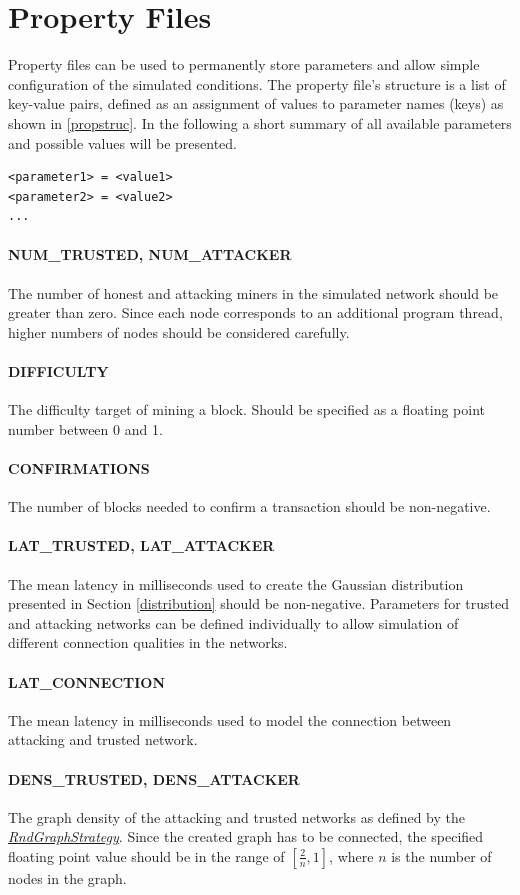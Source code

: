 \documentclass[a4paper,12pt,twoside]{report}
\begin{document}
\appendix

\chapter{Property Files} \label{prop}
Property files can be used to permanently store parameters and allow simple configuration of the simulated conditions. The property file's structure is a list of key-value pairs, defined as an assignment of values to parameter names (keys) as shown in \autoref{propstruc}. In the following a short summary of all available parameters and possible values will be presented.
\begin{lstlisting}[caption=Property file structure,label=propstruc]
<parameter1> = <value1>
<parameter2> = <value2>
...
\end{lstlisting}
\subsubsection{NUM\_TRUSTED, NUM\_ATTACKER}
The number of honest and attacking miners in the simulated network should be greater than zero. Since each node corresponds to an additional program thread, higher numbers of nodes should be considered carefully.
\subsubsection{DIFFICULTY}
The difficulty target of mining a block. Should be specified as a floating point number between 0 and 1.
\subsubsection{CONFIRMATIONS}
The number of blocks needed to confirm a transaction should be non-negative.
\subsubsection{LAT\_TRUSTED, LAT\_ATTACKER}
The mean latency in milliseconds used to create the Gaussian distribution presented in Section \ref{distribution} should be non-negative. Parameters for trusted and attacking networks can be defined individually to allow simulation of different connection qualities in the networks.
\subsubsection{LAT\_CONNECTION}
The mean latency in milliseconds used to model the connection between attacking and trusted network.
\subsubsection{DENS\_TRUSTED, DENS\_ATTACKER}
The graph density of the attacking and trusted networks as defined by the \hyperref[rndgraphstrategy]{\textit{RndGraphStrategy}}. Since the created graph has to be connected, the specified floating point value should be in the range of $[\frac{2}{n}, 1]$, where $n$ is the number of nodes in the graph.
\end{document}
